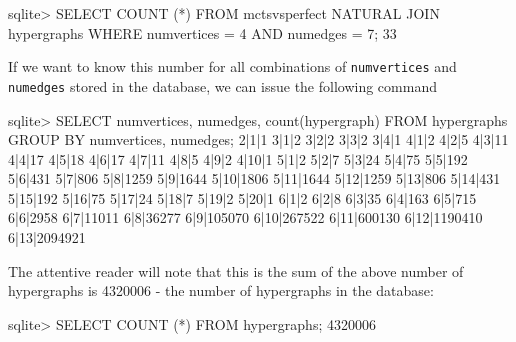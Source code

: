 \begin{code}
sqlite> SELECT COUNT (*) FROM
        mctsvsperfect NATURAL JOIN hypergraphs
        WHERE numvertices = 4 AND numedges = 7;
33
\end{code}

If we want to know this number for all combinations of \texttt{numvertices} and \texttt{numedges} stored in the database, we can issue the following command

\begin{code}

sqlite> SELECT numvertices, numedges, count(hypergraph)
        FROM hypergraphs
        GROUP BY numvertices, numedges;
2|1|1
3|1|2
3|2|2
3|3|2
3|4|1
4|1|2
4|2|5
4|3|11
4|4|17
4|5|18
4|6|17
4|7|11
4|8|5
4|9|2
4|10|1
5|1|2
5|2|7
5|3|24
5|4|75
5|5|192
5|6|431
5|7|806
5|8|1259
5|9|1644
5|10|1806
5|11|1644
5|12|1259
5|13|806
5|14|431
5|15|192
5|16|75
5|17|24
5|18|7
5|19|2
5|20|1
6|1|2
6|2|8
6|3|35
6|4|163
6|5|715
6|6|2958
6|7|11011
6|8|36277
6|9|105070
6|10|267522
6|11|600130
6|12|1190410
6|13|2094921


\end{code}


The attentive reader will note that this is the sum of the above number of hypergraphs is 4320006 - the number of hypergraphs in the database:

\begin{code}
sqlite> SELECT COUNT (*) FROM hypergraphs;
4320006
\end{code}
